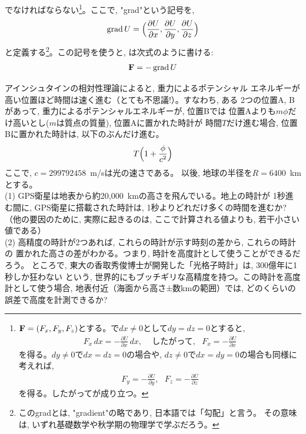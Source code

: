 でなければならない\footnote{
${\bf F}=(F_x, F_y, F_z)$とする。で$dx\ne0$として$dy=dz=0$とすると, 
\begin{eqnarray*}F_x\,dx=-\frac{\partial U}{\partial x}\,dx,\,\,\,\,\,\,\,\text{したがって, }\,\,\,F_x=-\frac{\partial U}{\partial x}\end{eqnarray*}
を得る。$dy\ne0$で$dx=dz=0$の場合や, $dz\ne0$で$dx=dy=0$の場合も同様に考えれば, 
\begin{eqnarray*}F_y=-\frac{\partial U}{\partial y},\,\,\,\,F_z=-\frac{\partial U}{\partial z}\end{eqnarray*}
を得る。したがってが成り立つ。}。ここで, "grad"という記号を, 
\begin{eqnarray}
\operatorname{grad} U=\Bigl(\frac{\partial U}{\partial x}, \frac{\partial U}{\partial y}, \frac{\partial U}{\partial z}\Bigr)
\end{eqnarray}
と定義する\footnote{このgradとは, "gradient"の略であり, 日本語では「勾配」と言う。
その意味は, いずれ基礎数学や秋学期の物理学で学ぶだろう。}。この記号を使うと, 
は次式のように書ける:
\begin{eqnarray} 
{\bf F}=-\operatorname{grad} U\label{eq:F_gradU2}
\end{eqnarray} 
\mv

\begin{exq} アインシュタインの相対性理論によると, 重力によるポテンシャル
エネルギーが高い位置ほど時間は速く進む（とても不思議!）。すなわち, ある
2つの位置A, Bがあって, 重力によるポテンシャルエネルギーが, 位置Bでは
位置Aよりも$m\phi$だけ高いとし($m$は質点の質量), 位置Aに置かれた時計が
時間$T$だけ進む場合, 位置Bに置かれた時計は, 以下のぶんだけ進む。
\begin{eqnarray}
T\Bigl(1+\frac{\phi}{c^2}\Bigr)
\end{eqnarray}
ここで, $c=299792458$~m/sは光の速さである。
以後, 地球の半径を$R=6400$~kmとする。\\
(1) GPS衛星は地表から約20,000~kmの高さを飛んでいる。地上の時計が
1秒進む間に, GPS衛星に搭載された時計は, 1秒よりどれだけ多くの時間を進むか? 
（他の要因のために, 実際に起きるのは, ここで計算される値よりも, 若干小さい値である）\\
(2) 高精度の時計が2つあれば, これらの時計が示す時刻の差から, これらの時計の
置かれた高さの差がわかる。つまり, 時計を高度計として使うことができるだろう。
ところで, 東大の香取秀俊博士が開発した「光格子時計」は, 300億年に1秒しか狂わない
という, 世界的にもブッチギリな高精度を持つ。この時計を高度計として使う場合, 
地表付近（海面から高さ±数kmの範囲）では, どのくらいの誤差で高度を計測できるか?
\end{exq}


